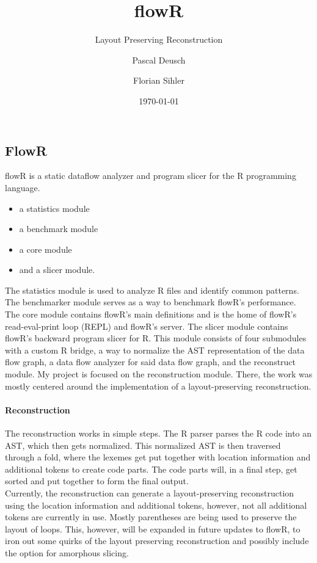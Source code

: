 \documentclass[a3paper, portrait, english, default]{uulm-cs-poster}
\title{flowR}
\subtitle{Layout Preserving Reconstruction}
\author{Pascal Deusch\and Florian Sihler}
\institute{Institut für Software Engineering und Programmiersprachen}
\date{\today}
\begin{document}
\maketitle
\begin{multicols}{2}
\section*{FlowR}
flowR is a static dataflow analyzer and program slicer for the R programming language.\\%
   \begin{itemize}
      \item a statistics module
      \item a benchmark module
	  \item a core module
      \item and a slicer module.
   \end{itemize}

The statistics module is used to analyze R files and identify common patterns. The benchmarker module serves as a way to benchmark flowR's performance. The core module contains flowR's main definitions and is the home of flowR's read-eval-print loop (REPL) and flowR's server. The slicer module contains flowR's backward program slicer for R. This module consists of four submodules with a custom R bridge, a way to normalize the AST representation of the data flow graph, a data flow analyzer for said data flow graph, and the reconstruct module.
My project is focused on the reconstruction module. There, the work was mostly centered around the implementation of a layout-preserving reconstruction. 
\paragraph{Reconstruction}
The reconstruction works in simple steps. The R parser parses the R code into an AST, which then gets normalized. This normalized AST is then traversed through a fold, where the lexemes get put together with location information and additional tokens to create code parts. The code parts will, in a final step, get sorted and put together to form the final output.\\ Currently, the reconstruction can generate a layout-preserving reconstruction using the location information and additional tokens, however, not all additional tokens are currently in use. Mostly parentheses are being used to preserve the layout of loops. This, however, will be expanded in future updates to flowR, to iron out some quirks of the layout preserving reconstruction and possibly include the option for amorphous slicing.\\ 
\columnbreak

\end{multicols}
\end{document}
